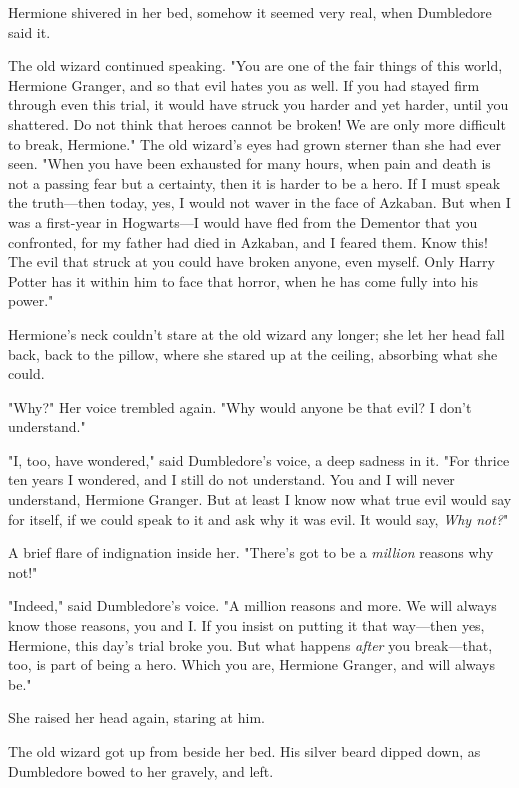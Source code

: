Hermione shivered in her bed, somehow it seemed very real, when Dumbledore said 
it.

The old wizard continued speaking. "You are one of the fair things of this 
world, Hermione Granger, and so that evil hates you as well. If you had stayed 
firm through even this trial, it would have struck you harder and yet harder, 
until you shattered. Do not think that heroes cannot be broken! We are only 
more difficult to break, Hermione." The old wizard's eyes had grown sterner 
than she had ever seen. "When you have been exhausted for many hours, when pain 
and death is not a passing fear but a certainty, then it is harder to be a 
hero. If I must speak the truth---then today, yes, I would not waver in the 
face of Azkaban. But when I was a first-year in Hogwarts---I would have fled 
from the Dementor that you confronted, for my father had died in Azkaban, and I 
feared them. Know this! The evil that struck at you could have broken anyone, 
even myself. Only Harry Potter has it within him to face that horror, when he 
has come fully into his power."

Hermione's neck couldn't stare at the old wizard any longer; she let her head 
fall back, back to the pillow, where she stared up at the ceiling, absorbing 
what she could.

"Why?" Her voice trembled again. "Why would anyone be that evil? I don't 
understand."

"I, too, have wondered," said Dumbledore's voice, a deep sadness in it. "For 
thrice ten years I wondered, and I still do not understand. You and I will 
never understand, Hermione Granger. But at least I know now what true evil 
would say for itself, if we could speak to it and ask why it was evil. It would 
say, \emph{Why not?}"

A brief flare of indignation inside her. "There's got to be a \emph{million} 
reasons why not!"

"Indeed," said Dumbledore's voice. "A million reasons and more. We will always 
know those reasons, you and I. If you insist on putting it that way---then yes, 
Hermione, this day's trial broke you. But what happens \emph{after} you 
break---that, too, is part of being a hero. Which you are, Hermione Granger, 
and will always be."

She raised her head again, staring at him.

The old wizard got up from beside her bed. His silver beard dipped down, as 
Dumbledore bowed to her gravely, and left.

